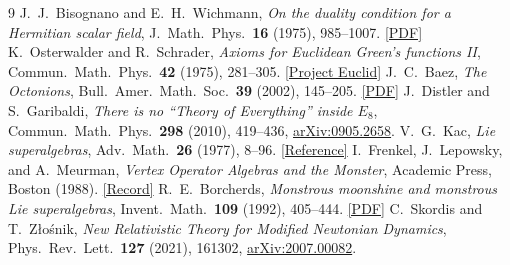 \documentclass[11pt,a4paper]{article}
\theoremstyle{definition}
\begin{document}
\begin{thebibliography}{9}
J.~J.~Bisognano and E.~H.~Wichmann, \emph{On the duality condition for a Hermitian scalar field}, J.\ Math.\ Phys.\ \textbf{16} (1975), 985--1007. \href{https://scispace.com/pdf/on-the-duality-condition-for-a-hermitian-scalar-field-2ap1nchhjj.pdf}{[PDF]}
K.~Osterwalder and R.~Schrader, \emph{Axioms for Euclidean Green's functions II}, Commun.\ Math.\ Phys.\ \textbf{42} (1975), 281--305. \href{https://projecteuclid.org/journals/communications-in-mathematical-physics/volume-42/issue-3/Axioms-for-Euclidean-Greens-functions-II-with-an-Appendix-by/cmp/1103899050.pdf}{[Project Euclid]}
J.~C.~Baez, \emph{The Octonions}, Bull.\ Amer.\ Math.\ Soc.\ \textbf{39} (2002), 145--205. \href{https://math.ucr.edu/home/baez/octonions/octonions.pdf}{[PDF]}
J.~Distler and S.~Garibaldi, \emph{There is no ``Theory of Everything'' inside $E_8$}, Commun.\ Math.\ Phys.\ \textbf{298} (2010), 419--436, \href{https://arxiv.org/abs/0905.2658}{arXiv:0905.2658}.
V.~G.~Kac, \emph{Lie superalgebras}, Adv.\ Math.\ \textbf{26} (1977), 8--96. \href{https://www.scirp.org/reference/referencespapers?referenceid=1458271}{[Reference]}
I.~Frenkel, J.~Lepowsky, and A.~Meurman, \emph{Vertex Operator Algebras and the Monster}, Academic Press, Boston (1988). \href{https://portal.research.lu.se/en/publications/vertex-operator-algebras-and-the-monster/}{[Record]}
R.~E.~Borcherds, \emph{Monstrous moonshine and monstrous Lie superalgebras}, Invent.\ Math.\ \textbf{109} (1992), 405--444. \href{https://math.berkeley.edu/~reb/papers/monster/monster.pdf}{[PDF]}
C.~Skordis and T.~Z\l o\'snik, \emph{New Relativistic Theory for Modified Newtonian Dynamics}, Phys.\ Rev.\ Lett.\ \textbf{127} (2021), 161302, \href{https://arxiv.org/abs/2007.00082}{arXiv:2007.00082}.
\end{thebibliography}
\end{document}
